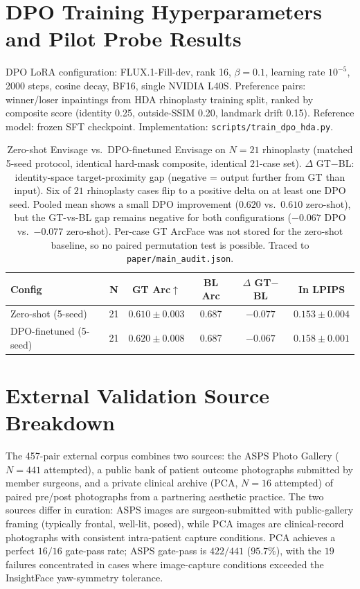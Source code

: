 \documentclass{article}
\newcommand{\method}{Envisage}
\begin{document}
\section{DPO Training Hyperparameters and Pilot Probe Results}
\label{app:dpo_hparams}

DPO LoRA configuration: FLUX.1-Fill-dev, rank 16, $\beta{=}0.1$, learning rate $10^{-5}$,
2000 steps, cosine decay, BF16, single NVIDIA L40S. Preference pairs: winner/loser
inpaintings from HDA rhinoplasty training split, ranked by composite score
(identity 0.25, outside-SSIM 0.20, landmark drift 0.15). Reference model:
frozen SFT checkpoint. Implementation: \texttt{scripts/train\_dpo\_hda.py}.

\begin{table}[h]
\centering
\small
\caption{Zero-shot \method{} vs.\ DPO-finetuned \method{} on $N{=}21$ rhinoplasty
(matched 5-seed protocol, identical hard-mask composite, identical 21-case set).
$\Delta$ GT$-$BL: identity-space target-proximity gap (negative = output further from GT than input).
Six of $21$ rhinoplasty cases flip to a positive delta on at least one DPO seed.
Pooled mean shows a small DPO improvement ($0.620$ vs.\ $0.610$ zero-shot), but
the GT-vs-BL gap remains negative for both configurations ($-0.067$ DPO vs.\
$-0.077$ zero-shot). Per-case GT ArcFace was not stored for the zero-shot
baseline, so no paired permutation test is possible.
Traced to \texttt{paper/main\_audit.json}.}
\label{tab:m9_dpo}
\begin{tabular}{@{}lccccc@{}}
\toprule
\textbf{Config} & \textbf{N} & \textbf{GT Arc}$\uparrow$ &
\textbf{BL Arc} & \textbf{$\Delta$ GT$-$BL} & \textbf{In LPIPS} \\
\midrule
Zero-shot (5-seed)        & 21 & $0.610 \pm 0.003$ & 0.687 & $-0.077$ & $0.153 \pm 0.004$ \\
DPO-finetuned (5-seed)    & 21 & $0.620 \pm 0.008$ & 0.687 & $-0.067$ & $0.158 \pm 0.001$ \\
\bottomrule
\end{tabular}
\end{table}

\section{External Validation Source Breakdown}
\label{app:external_sources}

The 457-pair external corpus combines two sources: the ASPS Photo Gallery
($N{=}441$ attempted), a public bank of patient outcome photographs
submitted by member surgeons, and a private clinical archive (PCA,
$N{=}16$ attempted) of paired pre/post photographs from a partnering
aesthetic practice. The two sources differ in curation: ASPS images are
surgeon-submitted with public-gallery framing (typically frontal,
well-lit, posed), while PCA images are clinical-record photographs with
consistent intra-patient capture conditions. PCA achieves a perfect
$16/16$ gate-pass rate; ASPS gate-pass is $422/441$ ($95.7\%$), with the
$19$ failures concentrated in cases where image-capture conditions
exceeded the InsightFace yaw-symmetry tolerance.
\end{document}
